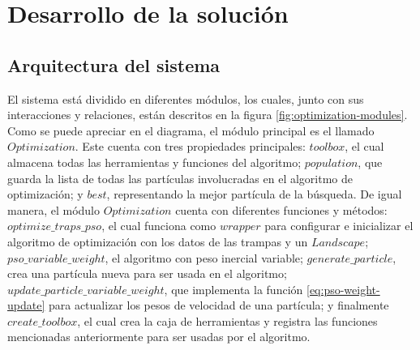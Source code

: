 \section{Desarrollo de la solución}
  \subsection{Arquitectura del sistema}

  El sistema está dividido en diferentes módulos, los cuales, junto con sus
  interacciones y relaciones, están descritos en la figura
  \ref{fig:optimization-modules}. Como se puede apreciar en el diagrama, el
  módulo principal es el llamado $Optimization$. Este cuenta con tres
  propiedades principales: $toolbox$, el cual almacena todas las herramientas
  y funciones del algoritmo; $population$, que guarda la lista de todas las
  partículas involucradas en el algoritmo de optimización; y $best$,
  representando la mejor partícula de la búsqueda. De igual manera, el módulo
  $Optimization$ cuenta con diferentes funciones y métodos:
  $optimize\_traps\_pso$, el cual funciona como $wrapper$ para configurar e
  inicializar el algoritmo de optimización con los datos de las trampas y un
  $Landscape$; $pso\_variable\_weight$, el algoritmo con peso inercial
  variable; $generate\_particle$, crea una partícula nueva para ser usada en
  el algoritmo; $update\_particle\_variable\_weight$, que implementa la
  función \ref{eq:pso-weight-update} para actualizar los pesos de velocidad de
  una partícula; y finalmente $create\_toolbox$, el cual crea la caja de
  herramientas y registra las funciones mencionadas anteriormente para ser
  usadas por el algoritmo.

